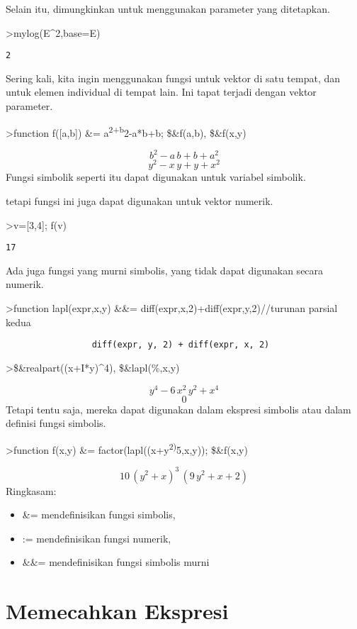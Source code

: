 \documentclass[
]{book}
\begin{document}
Selain itu, dimungkinkan untuk menggunakan parameter yang ditetapkan.

\textgreater mylog(E\^{}2,base=E)

\begin{verbatim}
2
\end{verbatim}

Sering kali, kita ingin menggunakan fungsi untuk vektor di satu tempat, dan untuk elemen individual di tempat lain. Ini tapat terjadi dengan vektor parameter.

\textgreater function f({[}a,b{]}) \&= a\textsuperscript{2+b}2-a*b+b; \$\&f(a,b), \$\&f(x,y)

\[b^2-a\,b+b+a^2\]\[y^2-x\,y+y+x^2\]Fungsi simbolik seperti itu dapat digunakan untuk variabel simbolik.

tetapi fungsi ini juga dapat digunakan untuk vektor numerik.

\textgreater v={[}3,4{]}; f(v)

\begin{verbatim}
17
\end{verbatim}

Ada juga fungsi yang murni simbolis, yang tidak dapat digunakan secara numerik.

\textgreater function lapl(expr,x,y) \&\&= diff(expr,x,2)+diff(expr,y,2)//turunan parsial kedua

\begin{verbatim}
                 diff(expr, y, 2) + diff(expr, x, 2)
\end{verbatim}

\textgreater\$\&realpart((x+I*y)\^{}4), \$\&lapl(\%,x,y)

\[y^4-6\,x^2\,y^2+x^4\]\[0\]Tetapi tentu saja, mereka dapat digunakan dalam ekspresi simbolis atau dalam definisi fungsi simbolis.

\textgreater function f(x,y) \&= factor(lapl((x+y\textsuperscript{2)}5,x,y)); \$\&f(x,y)

\[10\,\left(y^2+x\right)^3\,\left(9\,y^2+x+2\right)\]Ringkasam:

\begin{itemize}
\item
  \&= mendefinisikan fungsi simbolis,
\item
  := mendefinisikan fungsi numerik,
\item
  \&\&= mendefinisikan fungsi simbolis murni
\end{itemize}

\section{Memecahkan Ekspresi}\label{memecahkan-ekspresi}
\end{document}
